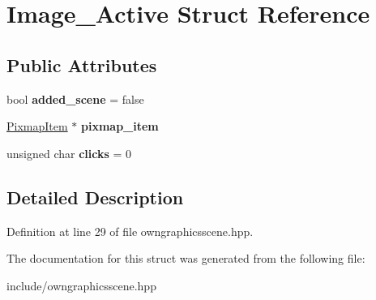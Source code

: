 \hypertarget{structImage__Active}{}\section{Image\+\_\+\+Active Struct Reference}
\label{structImage__Active}
\subsection*{Public Attributes}
\begin{DoxyCompactItemize}
\item 
\mbox{\label{structImage__Active_ac5eb10f5ca4ad81766c92a6ede6f7853}} 
bool {\bfseries added\+\_\+scene} = false
\item 
\mbox{\label{structImage__Active_aa007ea3c9ba4830bbc2706af51820c20}} 
\mbox{\hyperlink{classPixmapItem}{Pixmap\+Item}} $\ast$ {\bfseries pixmap\+\_\+item}
\item 
\mbox{\label{structImage__Active_abb039226daf0372a8d88c842f5eb140f}} 
unsigned char {\bfseries clicks} = 0
\end{DoxyCompactItemize}


\subsection{Detailed Description}


Definition at line 29 of file owngraphicsscene.\+hpp.



The documentation for this struct was generated from the following file\+:\begin{DoxyCompactItemize}
\item 
include/owngraphicsscene.\+hpp\end{DoxyCompactItemize}
